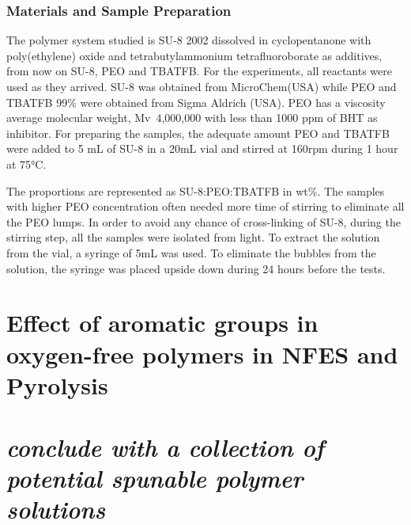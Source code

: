 \subsubsection{Materials and Sample Preparation}
The polymer system studied is SU-8 2002 dissolved in cyclopentanone with poly(ethylene) oxide and tetrabutylammonium tetrafluoroborate as additives, from now on SU-8, PEO and TBATFB. For the experiments, all reactants were used as they arrived. SU-8 was obtained from MicroChem(USA) while PEO and TBATFB 99\% were obtained from Sigma Aldrich (USA). PEO has a viscosity average molecular weight, Mv~4,000,000 with less than 1000 ppm of BHT as inhibitor. For preparing the samples, the adequate amount PEO and TBATFB were added
to 5 mL of SU-8 in a 20mL vial and stirred at 160rpm during 1 hour at 75°C.

The proportions are represented as SU-8:PEO:TBATFB in wt\%. The samples with higher PEO concentration often needed more time of stirring to eliminate all the PEO lumps. In order to avoid any chance of cross-linking of SU-8, during the stirring step, all the samples were isolated from light. To extract the solution from the vial, a syringe of 5mL was used. To eliminate the bubbles from the solution, the syringe was placed upside down during 24 hours before the tests.


\section{Effect of aromatic groups in oxygen-free polymers in NFES and Pyrolysis}



\section{\emph{conclude with a collection of potential spunable polymer solutions}}